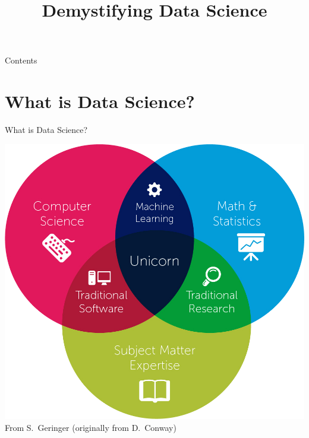 

\title{Demystifying Data Science}



\maketitle

\begin{frame}{Contents}
    \tableofcontents[hideallsubsections]
\end{frame}

\section{What is Data Science?}

\begin{frame}{What is Data Science?}
    \begin{center}
        \includegraphics[height=0.8\textheight]{figures/data_science_venn_diagram} \\
        {\scriptsize%
         From S.\ Geringer (originally from D.\ Conway)}
    \end{center}
\end{frame}

